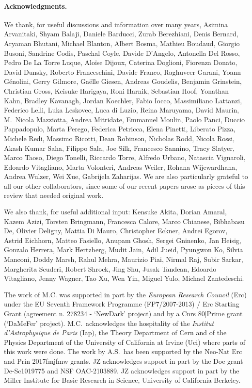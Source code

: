
\small
\paragraph{Acknowledgments.}
We thank, for useful discussions and information over many years, 
Asimina Arvanitaki, Shyam Balaji, Daniele Barducci,
Zurab Berezhiani, Denis Bernard, Aryaman Bhutani, Michael Blanton, Albert Bosma, Mathieu Boudaud, Giorgio Busoni,
Sandrine Codis, Paschal Coyle, Davide D'Angelo, Antonella Del Rosso, Pedro De La Torre Luque, Alo\"ise Dijoux, Caterina Doglioni, Fiorenza Donato, David Dunsky, 
Roberto Franceschini, Davide Franco, Raghuveer Garani,
Yoann G\'enolini, Gerry Gilmore, Ga\"elle Giesen, Andreas Goudelis, Benjamin Grinstein, Christian Gross, 
Keisuke Harigaya, Roni Harnik, Sebastian Hoof, Yonathan Kahn, Bradley Kavanagh, Jordan Koechler,
Fabio Iocco, Massimiliano Lattanzi, Federico Lelli, Luka Leskovec, Luca di Luzio,
Reina Maruyama, David Maurin, M.~Nicola Mazziotta, Andrea Mitridate, Emmanuel Moulin, 
Paolo Panci, Duccio Pappadopulo, Marta Perego, Federica Petricca, Elena Pinetti, Liberato Pizza,
Michele Redi,  Massimo Ricotti, Dean Robinson, Nicholas Rodd, Nicola Rossi, 
Akash Kumar Saha, Filippo Sala, Joe Silk, Francesco Sannino, Tracy Slatyer, 
Marco Taoso, Diego Tonelli, Riccardo Torre, 
Alfredo Urbano, Natascia Vignaroli, Edoardo Vitagliano, Marta Volonteri, 
Andreas Weiler, Rohana Wijewardhana, Andrea Wulzer, Wei Xue, Gabrijela Zaharijas. 
We are also particularly grateful to all our other collaborators, since some of our recent papers arose as pieces of this review that needed original work.

We also thank, for useful additional input: Kensuke Akita, Dorian Amaral, Kazem Azizi, Torsten Bringmann, Francesca Calore, Marco Chianese, Bibhabasu De, Olivier Deligny, Mattia Di Mauro, Christopher Eckner, Andrei Egorov, Astrid Eichhorn, Matteo Fasiello, Anupam Ghosh, Sergei Gninenko, Jan Heisig, Gonzalo Herrera, Mark Hertzberg, Mudit Jain, Adil Jueid, Pyungwon Ko, Silvia Manconi, Doddy Marsh, Rahul Mehra, Maurizio Piai, Nirmal Raj, Subir Sarkar, Margherita Scuderi, Robert Shrock, Jing Shu, Jusak Tandean, Edoardo Vitagliano, Jenny Wagner, Tao Xu, Wen Yin, Miguel Yulo, Michael Zantedeschi.

\medskip

The work of M.C. was supported in part by the {\em European Research Council} ({\sc Erc}) under the EU Seventh Framework Programme (FP7/2007-2013) / {\sc Erc} Starting Grant (agreement n. 278234 - `{\sc NewDark}' project) and by a {\sc Cnrs 80|Prime} grant (`{\sc DaMeFer}' project).
M.C.~acknowledges the hospitality of the {\em Institut d'Astrophysique de Paris} ({\sc Iap}), the Theory Department of {\sc Cern} and of the Physics Department of the University of California at Irvine ({\sc Uci}) where parts of this work were done. 
The work by A.S.\ has been supported by the {\sc Neo-Nat Erc} and {\sc Prin 2017fmjfmw} grants. JZ acknowledges support in part by the {\sc Doe} grant {\sc De-Sc1019775} and {\sc NSF OAC-2103889}. JZ acknowledges support in part by the Miller Institute for Basic Research in Science, University of California Berkeley.


